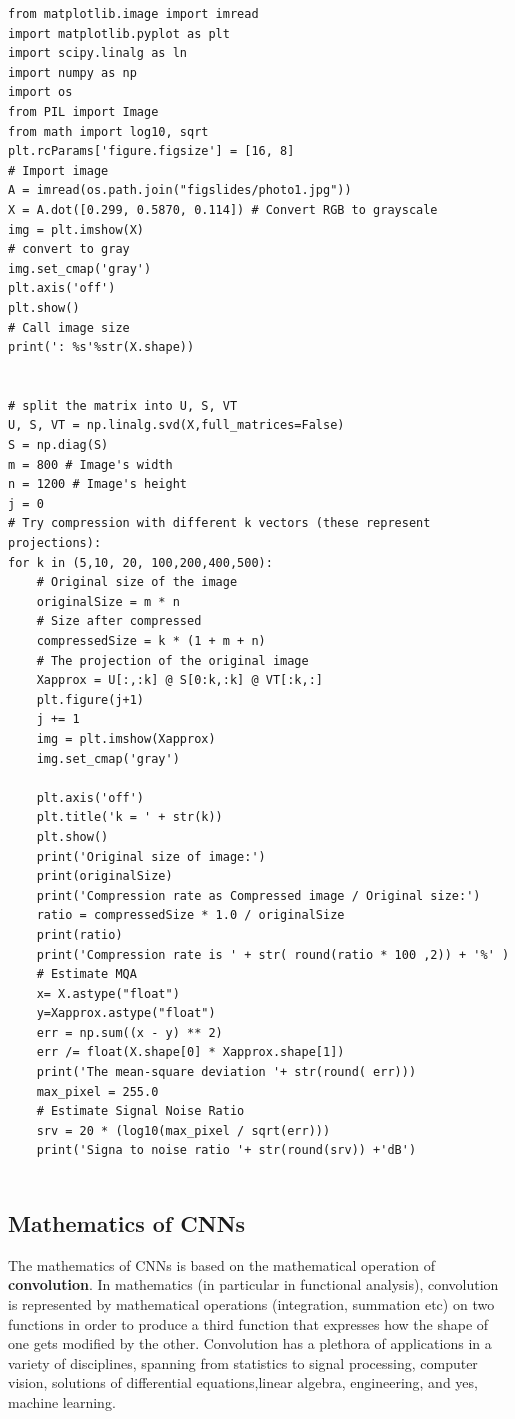 \documentclass[%
oneside,                 %
final,                   %
10pt]{article}
\begin{document}
\begin{verbatim}
from matplotlib.image import imread
import matplotlib.pyplot as plt
import scipy.linalg as ln
import numpy as np
import os
from PIL import Image
from math import log10, sqrt 
plt.rcParams['figure.figsize'] = [16, 8]
# Import image
A = imread(os.path.join("figslides/photo1.jpg"))
X = A.dot([0.299, 0.5870, 0.114]) # Convert RGB to grayscale
img = plt.imshow(X)
# convert to gray
img.set_cmap('gray')
plt.axis('off')
plt.show()
# Call image size
print(': %s'%str(X.shape))


# split the matrix into U, S, VT
U, S, VT = np.linalg.svd(X,full_matrices=False)
S = np.diag(S)
m = 800 # Image's width
n = 1200 # Image's height
j = 0
# Try compression with different k vectors (these represent projections):
for k in (5,10, 20, 100,200,400,500):
    # Original size of the image
    originalSize = m * n 
    # Size after compressed
    compressedSize = k * (1 + m + n) 
    # The projection of the original image
    Xapprox = U[:,:k] @ S[0:k,:k] @ VT[:k,:]
    plt.figure(j+1)
    j += 1
    img = plt.imshow(Xapprox)
    img.set_cmap('gray')
    
    plt.axis('off')
    plt.title('k = ' + str(k))
    plt.show() 
    print('Original size of image:')
    print(originalSize)
    print('Compression rate as Compressed image / Original size:')
    ratio = compressedSize * 1.0 / originalSize
    print(ratio)
    print('Compression rate is ' + str( round(ratio * 100 ,2)) + '%' )  
    # Estimate MQA
    x= X.astype("float")
    y=Xapprox.astype("float")
    err = np.sum((x - y) ** 2)
    err /= float(X.shape[0] * Xapprox.shape[1])
    print('The mean-square deviation '+ str(round( err)))
    max_pixel = 255.0
    # Estimate Signal Noise Ratio
    srv = 20 * (log10(max_pixel / sqrt(err)))
    print('Signa to noise ratio '+ str(round(srv)) +'dB')


\end{verbatim}


\subsection{Mathematics of CNNs}

The mathematics of CNNs is based on the mathematical operation of
\textbf{convolution}.  In mathematics (in particular in functional analysis),
convolution is represented by mathematical operations (integration,
summation etc) on two functions in order to produce a third function
that expresses how the shape of one gets modified by the other.
Convolution has a plethora of applications in a variety of
disciplines, spanning from statistics to signal processing, computer
vision, solutions of differential equations,linear algebra,
engineering, and yes, machine learning.
\end{document}
